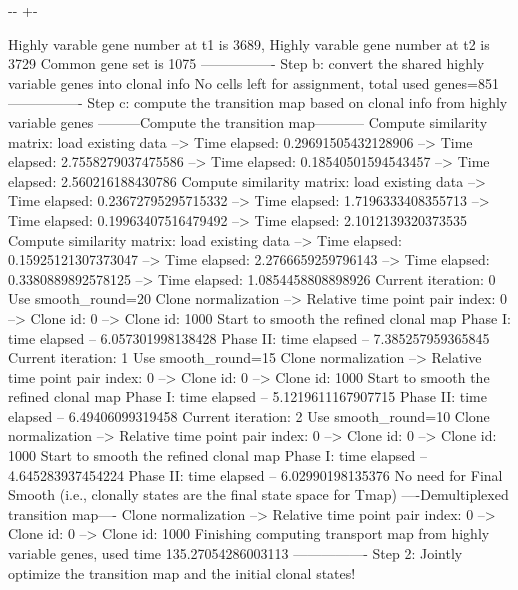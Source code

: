 \documentclass[letterpaper,10pt,english]{sphinxmanual}
\newlength\nbsphinxcodecellspacing
\begin{document}
{

\kern-\sphinxverbatimsmallskipamount\kern-\baselineskip
\kern+\FrameHeightAdjust\kern-\fboxrule
\vspace{\nbsphinxcodecellspacing}

\begin{sphinxVerbatim}[commandchars=\\\{\}]
Highly varable gene number at t1 is 3689, Highly varable gene number at t2 is 3729
Common gene set is 1075
----------------
Step b: convert the shared highly variable genes into clonal info
No cells left for assignment, total used genes=851
----------------
Step c: compute the transition map based on clonal info from highly variable genes
---------Compute the transition map-----------
Compute similarity matrix: load existing data
--> Time elapsed:  0.29691505432128906
--> Time elapsed:  2.7558279037475586
--> Time elapsed:  0.18540501594543457
--> Time elapsed:  2.560216188430786
Compute similarity matrix: load existing data
--> Time elapsed:  0.23672795295715332
--> Time elapsed:  1.7196333408355713
--> Time elapsed:  0.19963407516479492
--> Time elapsed:  2.1012139320373535
Compute similarity matrix: load existing data
--> Time elapsed:  0.15925121307373047
--> Time elapsed:  2.2766659259796143
--> Time elapsed:  0.3380889892578125
--> Time elapsed:  1.0854458808898926
Current iteration: 0
Use smooth\_round=20
Clone normalization
--> Relative time point pair index: 0
--> Clone id: 0
--> Clone id: 1000
Start to smooth the refined clonal map
Phase I: time elapsed --  6.057301998138428
Phase II: time elapsed --  7.385257959365845
Current iteration: 1
Use smooth\_round=15
Clone normalization
--> Relative time point pair index: 0
--> Clone id: 0
--> Clone id: 1000
Start to smooth the refined clonal map
Phase I: time elapsed --  5.1219611167907715
Phase II: time elapsed --  6.49406099319458
Current iteration: 2
Use smooth\_round=10
Clone normalization
--> Relative time point pair index: 0
--> Clone id: 0
--> Clone id: 1000
Start to smooth the refined clonal map
Phase I: time elapsed --  4.645283937454224
Phase II: time elapsed --  6.02990198135376
No need for Final Smooth (i.e., clonally states are the final state space for Tmap)
----Demultiplexed transition map----
Clone normalization
--> Relative time point pair index: 0
--> Clone id: 0
--> Clone id: 1000
Finishing computing transport map from highly variable genes, used time 135.27054286003113
----------------
Step 2: Jointly optimize the transition map and the initial clonal states!

\end{sphinxVerbatim}}
\end{document}
